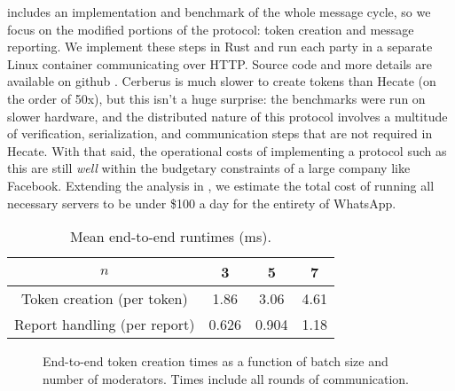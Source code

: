 \documentclass[conference]{IEEEtran}
\begin{document}
\textcite{hecate} includes an implementation and benchmark of the whole message cycle, so we focus on the modified portions of the protocol: token creation and message reporting.
We implement these steps in Rust and run each party in a separate Linux container communicating over HTTP. Source code and more details are available on github \cite{cerberus-github}.
Cerberus is much slower to create tokens than Hecate (on the order of 50x), but this isn't a huge surprise: the benchmarks were run on slower hardware, and the distributed nature of this protocol involves a multitude of verification, serialization, and communication steps that are not required in Hecate.
With that said, the operational costs of implementing a protocol such as this are still \textit{well} within the budgetary constraints of a large company like Facebook. Extending the analysis in \cite{hecate}, we estimate the total cost of running all necessary servers to be under \$100 a day for the entirety of WhatsApp.

\begin{table}[!t]
	\renewcommand{\arraystretch}{1.3}
	\caption{Mean end-to-end runtimes (ms).}
	\label{tab:mean-times}
	\centering\begin{tabular}{c | c c c}
		$n$ & 3     & 5     & 7    \\
		\hline \hline
		Token creation (per token)
		    & 1.86  & 3.06  & 4.61 \\
		Report handling (per report)
		    & 0.626 & 0.904 & 1.18
	\end{tabular}
\end{table}

\begin{figure}[!t]
	\centering
	\footnotesize
	
	\caption{End-to-end token creation times as a function of batch size and number of moderators. Times include all rounds of communication.}
	\label{fig:token-creation}
\end{figure}


\printbibliography
\end{document}
